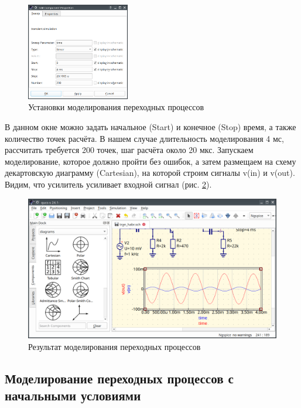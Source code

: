 \documentclass[a4paper,12pt]{article}
\begin{document}
    \begin{figure}[!ht]
    \begin{center}
        \includegraphics[width=0.4\textwidth]{img/tran_set.png}
    \end{center}
    \caption{Установки моделирования переходных процессов} \label{fig:tran_set}
    \end{figure}
    
В данном окне можно задать начальное (Start) и конечное (Stop) время, а также количество точек расчёта. В нашем случае длительность моделирования 4 мс, рассчитать требуется 200 точек, шаг расчёта около 20 мкс. Запускаем моделирование, которое должно пройти без ошибок, а затем размещаем на схему декартовскую диаграмму (Cartesian), на которой строим сигналы v(in) и v(out). Видим, что усилитель усиливает входной сигнал (рис. \ref{fig:tran_out}).

    \begin{figure}[!ht]
    \begin{center}
        \includegraphics[width=\textwidth]{img/tran_out.png}
    \end{center}
    \caption{Результат моделирования переходных процессов} \label{fig:tran_out}
    \end{figure}

\subsection{Моделирование переходных процессов с начальными условиями}
\end{document}

